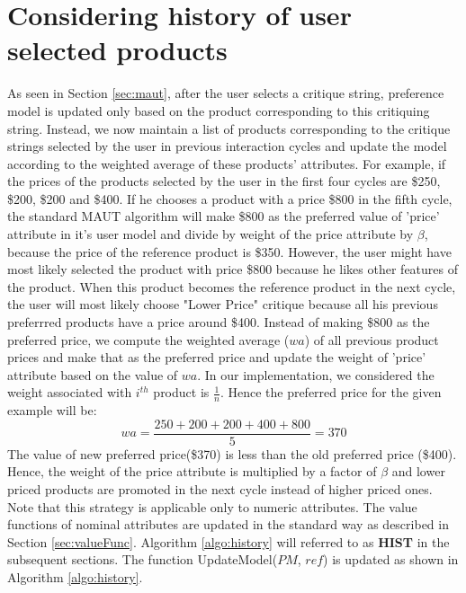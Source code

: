 \section{Considering history of user selected products}
\label{sec:hist}
As seen in Section \ref{sec:maut}, after the user selects a critique string, preference model is updated only based on the product corresponding to this critiquing string.
Instead, we now maintain a list of products corresponding to the critique strings selected by the user in previous interaction cycles and update the model according to the weighted average of these products' attributes.
For example, if the prices of the products selected by the user in the first four cycles are \$250, \$200, \$200 and \$400.
If he chooses a product with a price \$800 in the fifth cycle, the standard MAUT algorithm will make \$800 as the preferred value of 'price' attribute in it's user model and divide by weight of the price attribute by $\beta$, because the price of the reference product is \$350.
However, the user might have most likely selected the product with price \$800 because he likes other features of the product.
When this product becomes the reference product in the next cycle, the user will most likely choose "Lower Price" critique because all his previous preferrred products have a price around \$400.
Instead of making \$800 as the preferred price, we compute the weighted average ($wa$) of all previous product prices and make that as the preferred price and update the weight of 'price' attribute based on the value of $wa$.
In our implementation, we considered the weight associated with $i^{th}$ product is $\frac{1}{n}$. 
Hence the preferred price for the given example will be:
\begin{equation}
wa = \frac{250+200+200+400+800} {5} = 370
\end{equation}
The value of new preferred price(\$370) is less than the old preferred price (\$400).
Hence, the weight of the price attribute is multiplied by a factor of $\beta$ and lower priced products are promoted in the next cycle instead of higher priced ones.
Note that this strategy is applicable only to numeric attributes.
The value functions of nominal attributes are updated in the standard way as described in Section \ref{sec:valueFunc}.
Algorithm \ref{algo:history} will referred to as \textbf{HIST} in the subsequent sections.
The function UpdateModel($PM$, $ref$) is updated as shown in Algorithm 
\ref{algo:history}.



